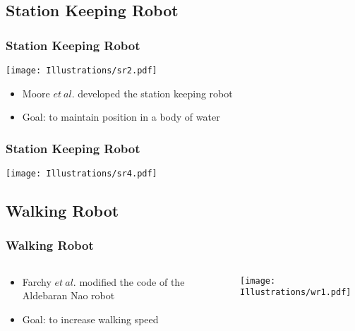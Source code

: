 \documentclass{beamer}
\begin{document}
\subsection{Station Keeping Robot}
\begin{frame}
  \frametitle{Station Keeping Robot}
\begin{center}
 \texttt{[image: Illustrations/sr2.pdf]}
       \\
\end{center}
\begin{itemize}
\item \large Moore $et~al.$ developed the station keeping robot
\item \large Goal: to maintain position in a body of water
\end{itemize}
\end{frame}

\begin{frame}
  \frametitle{Station Keeping Robot}
\begin{center}
 \texttt{[image: Illustrations/sr4.pdf]}
       \\
\end{center}

\end{frame}

\subsection{Walking Robot}
\begin{frame}
  \frametitle{Walking Robot}

\begin{columns}
  \begin{column}{0.5\textwidth}
\begin{itemize}
\item  Farchy $et~al.$ modified the code of the Aldebaran Nao robot
\item Goal: to increase walking speed
\end{itemize}
\end{column}
\begin{column}{0.5\textwidth}
 \texttt{[image: Illustrations/wr1.pdf]}
       \\
\end{column}
\end{columns}
\end{frame}
\end{document}
